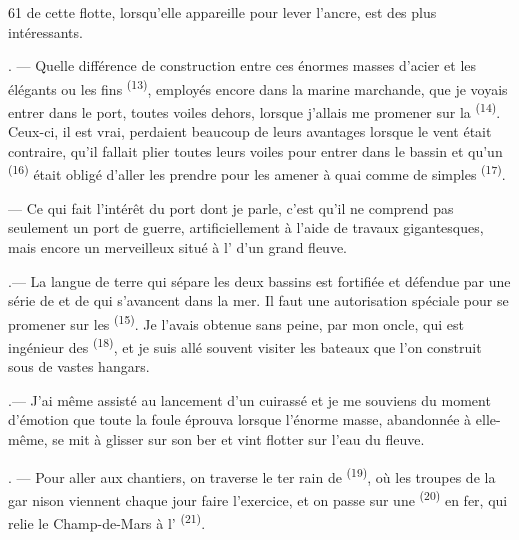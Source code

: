 \begin{VUpage}[63]{61}
\VUcontinue
de cette flotte, lorsqu'elle appareille pour lever\nl
l'ancre, est des plus intéressants.

. --- Quelle différence de construction entre ces\nl
énormes masses d'acier et les élégants \nl
ou les fins  \textsuperscript{(13)}, employés encore dans la\nl
marine marchande, que je voyais entrer dans le port,\nl
toutes voiles dehors, lorsque j'allais me promener sur\nl
la  \textsuperscript{(14)}. Ceux-ci, il est vrai, perdaient beaucoup\nl
de leurs avantages lorsque le vent était contraire,\nl
qu'il fallait plier toutes leurs voiles pour entrer dans\nl
le bassin et qu'un  \textsuperscript{(16)} était obligé d'aller\nl
les prendre pour les amener à quai comme de simples\nl
{} \textsuperscript{(17)}.

 --- Ce qui fait l'intérêt du port dont je parle, c'est\nl
qu'il ne comprend pas seulement un port de guerre,\nl
{} artificiellement à l'aide de travaux gigantesques,\nl
mais encore un merveilleux \nl
situé à l' d'un grand fleuve.

.--- La langue de terre qui sépare les deux bassins\nl
est fortifiée et défendue par une série de \nl
et de  qui s'avancent dans la mer. Il faut\nl
une autorisation spéciale pour se promener sur les\nl
{} \textsuperscript{(15)}. Je l'avais obtenue sans peine, par\nl
mon oncle, qui est ingénieur des \nl
{} \textsuperscript{(18)}, et je suis allé souvent visiter les\nl
bateaux que l'on construit sous de vastes hangars.

.--- J'ai même assisté au lancement d'un cuirassé\nl
et je me souviens du moment d'émotion que toute la\nl
foule éprouva lorsque l'énorme masse, abandonnée à\nl
elle-même, se mit à glisser sur son ber et vint flotter\nl
sur l'eau du fleuve.

. --- Pour aller aux chantiers, on traverse le ter\cc
rain de  \textsuperscript{(19)}, où les troupes de la gar\cc
nison viennent chaque jour faire l'exercice, et on\nl
passe sur une  \textsuperscript{(20)} en fer, qui relie le\nl
Champ-de-Mars à l' \textsuperscript{(21)}.
\end{VUpage}

